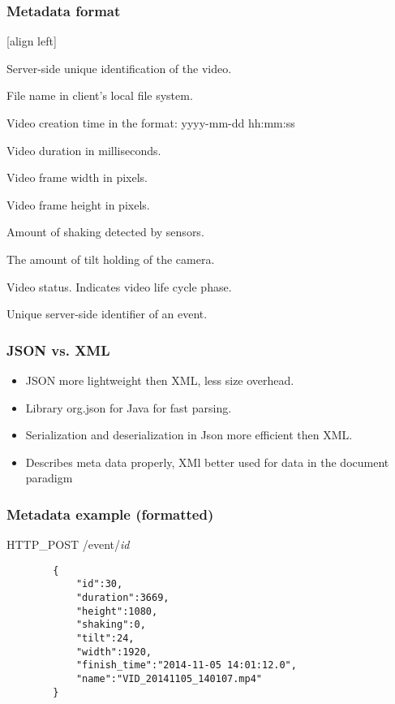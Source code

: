 \begin{frame}
	\frametitle{Metadata format}
	[align left]
	\begin{description}
		\item[id] 
			Server-side unique identification of the video.
		\item[name]
			File name in client's local file system.			
		\item[finish\_time]
			Video creation time in the format: yyyy-mm-dd hh:mm:ss
		\item[duration]
			Video duration in milliseconds.	
		\item[width]
			Video frame width in pixels.
		\item[height]
			Video frame height in pixels.		
		\item[shaking]
			Amount of shaking detected by sensors.
		\item[tilt]
			The amount of tilt holding of the camera.
		\item[status]
			Video status. Indicates video life cycle phase.
		\item[event\_id]
			Unique server-side identifier of an event.		
	\end{description}
\end{frame}

\begin{frame}[fragile]
	\frametitle{JSON vs. XML}
		\begin{itemize}
			\item JSON more lightweight then  XML, less size overhead.
			\item Library org.json for Java for fast parsing.
			\item Serialization and deserialization in Json more efficient then XML.
			\item Describes meta data properly, XMl better used for data in the document paradigm
		\end{itemize}
\end{frame}

\begin{frame}[fragile]
	\frametitle{Metadata example (formatted) }
		HTTP\_POST /event/\textit{id}\footnotemark
		\begin{verbatim}
		{
		    "id":30,
		    "duration":3669,
		    "height":1080,
		    "shaking":0,
		    "tilt":24,
		    "width":1920,
		    "finish_time":"2014-11-05 14:01:12.0",
		    "name":"VID_20141105_140107.mp4"
		}
		\end{verbatim}
\end{frame}
